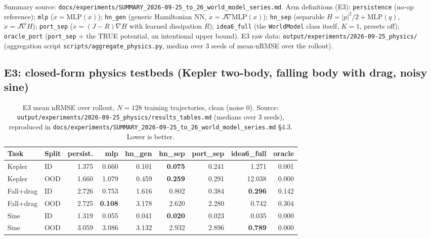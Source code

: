 \documentclass[11pt]{article}
\newcommand{\srcpath}[1]{\texttt{\small #1}}
\begin{document}
Summary source: \srcpath{docs/experiments/SUMMARY\_2026-09-25\_to\_26\_world\_model\_series.md}.
Arm definitions (E3): \texttt{persistence} (no-op reference); \texttt{mlp} ($\dot x = \text{MLP}(x)$);
\texttt{hn\_gen} (generic Hamiltonian NN, $\dot x = J\nabla\text{MLP}(x)$); \texttt{hn\_sep}
(separable $H=|p|^2/2+\text{MLP}(q)$, $\dot x = J\nabla H$); \texttt{port\_sep} ($\dot x =
(J-R)\nabla H$ with learned dissipation $R$); \texttt{idea6\_full} (the \texttt{WorldModel} class
itself, $K{=}1$, presets off); \texttt{oracle\_port} (\texttt{port\_sep} + the TRUE potential, an
intentional upper bound). E3 raw data: \srcpath{output/experiments/2026-09-25\_physics/}
(aggregation script \srcpath{scripts/aggregate\_physics.py}, median over 3 seeds of mean-nRMSE over
the rollout).

\subsection{E3: closed-form physics testbeds (Kepler two-body, falling body with drag, noisy sine)}

\begin{table}[h]
\centering
\small
\caption{E3 mean nRMSE over rollout, $N=128$ training trajectories, clean (noise 0). Source: \srcpath{output/experiments/2026-09-25\_physics/results\_tables.md} (medians over 3 seeds), reproduced in \srcpath{docs/experiments/SUMMARY\_2026-09-25\_to\_26\_world\_model\_series.md} \S4.3. Lower is better.}
\begin{tabular}{llrrrrrrr}
\toprule
Task & Split & persist. & mlp & hn\_gen & hn\_sep & port\_sep & idea6\_full & oracle \\
\midrule
Kepler & ID & 1.375 & 0.660 & 0.101 & \textbf{0.075} & 0.241 & 1.271 & 0.001 \\
Kepler & OOD & 1.660 & 1.079 & 0.459 & \textbf{0.259} & 0.291 & 12.038 & 0.000 \\
Fall+drag & ID & 2.726 & 0.753 & 1.616 & 0.802 & 0.384 & \textbf{0.296} & 0.142 \\
Fall+drag & OOD & 2.725 & \textbf{0.108} & 3.178 & 2.620 & 2.280 & 0.742 & 0.304 \\
Sine & ID & 1.319 & 0.055 & 0.041 & \textbf{0.020} & 0.023 & 0.035 & 0.000 \\
Sine & OOD & 3.059 & 3.086 & 3.132 & 2.932 & 2.896 & \textbf{0.789} & 0.000 \\
\bottomrule
\end{tabular}
\end{table}
\end{document}
